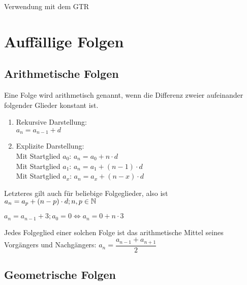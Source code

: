 \begin{GTR-Tipp}
Verwendung mit dem GTR
\end{GTR-Tipp}


		\section{Auffällige Folgen}


	\subsection{Arithmetische Folgen}

\begin{Definition}
Eine Folge wird arithmetisch genannt, wenn die Differenz zweier aufeinander folgender Glieder konstant ist.
\begin{enumerate}
\item Rekursive Darstellung:\\
\indent $a_{n}=a_{n-1}+d$
\item Explizite Darstellung:\\
\indent Mit Startglied $a_{0}$: $a_{n}=a_{0}+n\cdot d$\\
\indent Mit Startglied $a_{1}$: $a_{n}=a_{1}+(n-1)\cdot d$\\
\indent Mit Startglied $a_{x}$: $a_{n}=a_{x}+(n-x)\cdot d$
\end{enumerate}
\end{Definition}

\begin{Bemerkung}
Letzteres gilt auch für beliebige Folgeglieder, also ist $a_{n}=a_{p}+(n-p)\cdot d;n,p\in\mathbb{N}$
\end{Bemerkung}

\begin{Beispiel}
$a_{n}=a_{n-1}+3;a_{0}=0\Leftrightarrow a_{n}=0+n\cdot3$
\end{Beispiel}

\begin{Bemerkung}
Jedes Folgeglied einer solchen Folge ist das arithmetische Mittel seines Vorgängers und Nachgängers: $a_{n}=\dfrac{a_{n-1}+a_{n+1}}{2}$
\end{Bemerkung}

	\subsection{Geometrische Folgen}


